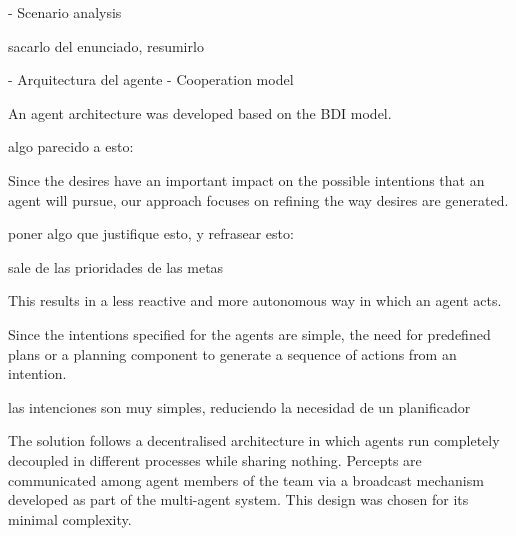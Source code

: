 \documentclass{llncs2e/llncs}
\begin{document}
\begin{comment}

PREGUNTAS {
1. If some multi-agent system methodology such as Prometheus, O-MaSE, or 
Tropos was used, how did you use it? 
   If you did not what were the reasons?
2. Is the solution based on the centralisation of coordination/information on 
a specific agent?
   Conversely if you plan a decentralised solution, which strategy do you plan 
to use?
3. What is the communication strategy and how complex is it?
4. How are the following agent features considered/implemented: autonomy, 
proactiveness, reactiveness?
5. Is the team a truly multi-agent system or rather a centralised system in 
disguise?
6. How much time (man hours) have you invested (approximately) for 
implementing your team?
7. Did you discuss the design and strategies of your agent team with other 
developers? 
   To which extent did your test your agents playing with other teams?
}

\end{comment}

- Scenario analysis

    sacarlo del enunciado, resumirlo

- Arquitectura del agente
- Cooperation model

    An agent architecture was developed based on the BDI model.

    algo parecido a esto:

    Since the desires have an important impact on the possible intentions that an 
    agent will pursue, our approach focuses on refining the way desires are 
    generated.

    poner algo que justifique esto, y refrasear esto:

    sale de las prioridades de las metas

    This results in a less reactive and more autonomous way in which an agent acts.

    Since the intentions specified for the agents are simple, the need for 
    predefined plans or a planning component to generate a sequence of actions 
    from an intention.
    
    las intenciones son muy simples, reduciendo la necesidad de un planificador

    The solution follows a decentralised architecture in which agents run 
    completely decoupled in different processes while sharing nothing. Percepts 
    are communicated among agent members of the team via a broadcast mechanism 
    developed as part of the multi-agent system. This design was chosen for its 
    minimal complexity.
\end{document}
